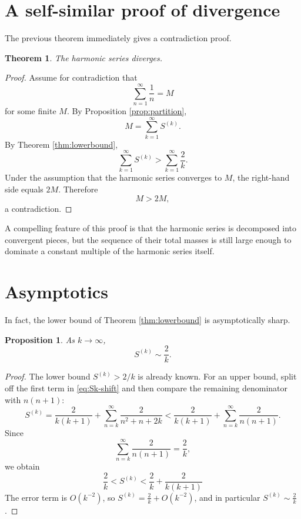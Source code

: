 \documentclass[11pt]{article}
\newtheorem{theorem}{Theorem}
\newtheorem{proposition}{Proposition}
\begin{document}
\section{A self-similar proof of divergence}

The previous theorem immediately gives a contradiction proof.

\begin{theorem}\label{thm:divergence}
The harmonic series diverges.
\end{theorem}

\begin{proof}
Assume for contradiction that
\[
\sum_{n=1}^{\infty} \frac{1}{n} = M
\]
for some finite $M$. By Proposition \ref{prop:partition},
\[
M = \sum_{k=1}^{\infty} S^{(k)}.
\]
By Theorem \ref{thm:lowerbound},
\[
\sum_{k=1}^{\infty} S^{(k)} > \sum_{k=1}^{\infty} \frac{2}{k}.
\]
Under the assumption that the harmonic series converges to $M$, the right-hand side equals $2M$. Therefore
\[
M > 2M,
\]
a contradiction.
\end{proof}

A compelling feature of this proof is that the harmonic series is decomposed into convergent pieces, but the sequence of their total masses is still large enough to dominate a constant multiple of the harmonic series itself.

\section{Asymptotics}

In fact, the lower bound of Theorem \ref{thm:lowerbound} is asymptotically sharp.

\begin{proposition}\label{prop:asymptotic}
As $k \to \infty$,
\[
S^{(k)} \sim \frac{2}{k}.
\]
\end{proposition}

\begin{proof}
The lower bound $S^{(k)} > 2/k$ is already known. For an upper bound, split off the first term in \eqref{eq:Sk-shift} and then compare the remaining denominator with $n(n+1)$:
\[
S^{(k)} = \frac{2}{k(k+1)} + \sum_{n=k}^{\infty} \frac{2}{n^2+n+2k}
< \frac{2}{k(k+1)} + \sum_{n=k}^{\infty} \frac{2}{n(n+1)}.
\]
Since
\[
\sum_{n=k}^{\infty} \frac{2}{n(n+1)} = \frac{2}{k},
\]
we obtain
\[
\frac{2}{k} < S^{(k)} < \frac{2}{k} +  \frac{2}{k(k+1)} 
\]
The error term is $O(k^{-2})$, so $S^{(k)} = \frac{2}{k} + O(k^{-2})$, and in particular $S^{(k)} \sim \frac{2}{k}$.
\end{proof}
\end{document}
